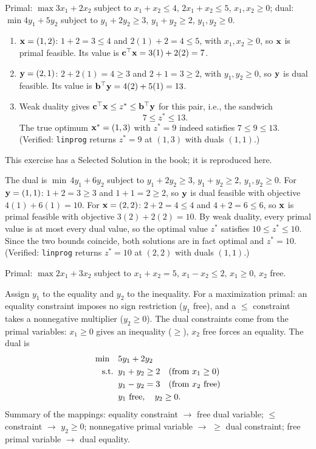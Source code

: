 Primal: $\max 3x_1 + 2x_2$ subject to $x_1 + x_2 \le 4$, $2x_1 + x_2 \le 5$, $x_1, x_2 \ge 0$; dual: $\min 4y_1 + 5y_2$ subject to $y_1 + 2y_2 \ge 3$, $y_1 + y_2 \ge 2$, $y_1, y_2 \ge 0$.

\begin{enumerate}
\item $\mathbf{x} = (1, 2)$: $1 + 2 = 3 \le 4$ and $2(1) + 2 = 4 \le 5$, with $x_1, x_2 \ge 0$, so $\mathbf{x}$ is primal feasible. Its value is $\mathbf{c}^\top\mathbf{x} = 3(1) + 2(2) = 7$.
\item $\mathbf{y} = (2, 1)$: $2 + 2(1) = 4 \ge 3$ and $2 + 1 = 3 \ge 2$, with $y_1, y_2 \ge 0$, so $\mathbf{y}$ is dual feasible. Its value is $\mathbf{b}^\top\mathbf{y} = 4(2) + 5(1) = 13$.
\item Weak duality gives $\mathbf{c}^\top\mathbf{x} \le z^* \le \mathbf{b}^\top\mathbf{y}$ for this pair, i.e., the sandwich
\[
7 \le z^* \le 13 .
\]
The true optimum $\mathbf{x}^* = (1, 3)$ with $z^* = 9$ indeed satisfies $7 \le 9 \le 13$. (Verified: \texttt{linprog} returns $z^* = 9$ at $(1,3)$ with duals $(1,1)$.)
\end{enumerate}


This exercise has a Selected Solution in the book; it is reproduced here.

The dual is $\min\, 4y_1 + 6y_2$ subject to $y_1 + 2y_2 \geq 3$, $y_1 + y_2 \geq 2$, $y_1, y_2 \geq 0$.
For $\mathbf{y} = (1,1)$: $1 + 2 = 3 \geq 3$ and $1 + 1 = 2 \geq 2$, so $\mathbf{y}$ is dual feasible with objective $4(1) + 6(1) = 10$.
For $\mathbf{x} = (2,2)$: $2 + 2 = 4 \leq 4$ and $4 + 2 = 6 \leq 6$, so $\mathbf{x}$ is primal feasible with objective $3(2) + 2(2) = 10$.
By weak duality, every primal value is at most every dual value, so the optimal value $z^*$ satisfies $10 \leq z^* \leq 10$. Since the two bounds coincide, both solutions are in fact optimal and $z^* = 10$. (Verified: \texttt{linprog} returns $z^* = 10$ at $(2,2)$ with duals $(1,1)$.)


Primal: $\max 2x_1 + 3x_2$ subject to $x_1 + x_2 = 5$, $x_1 - x_2 \le 2$, $x_1 \ge 0$, $x_2$ free.

Assign $y_1$ to the equality and $y_2$ to the inequality. For a maximization primal: an equality constraint imposes no sign restriction ($y_1$ free), and a $\leq$ constraint takes a nonnegative multiplier ($y_2 \ge 0$). The dual constraints come from the primal variables: $x_1 \ge 0$ gives an inequality ($\ge$), $x_2$ free forces an equality. The dual is
\[
\begin{aligned}
\min \quad & 5y_1 + 2y_2 \\
\text{s.t.}\;\; & y_1 + y_2 \ge 2 \quad \text{(from } x_1 \ge 0\text{)} \\
& y_1 - y_2 = 3 \quad \text{(from } x_2 \text{ free)} \\
& y_1 \text{ free}, \quad y_2 \ge 0 .
\end{aligned}
\]
Summary of the mappings: equality constraint $\to$ free dual variable; $\leq$ constraint $\to$ $y_2 \ge 0$; nonnegative primal variable $\to$ $\geq$ dual constraint; free primal variable $\to$ dual equality.

